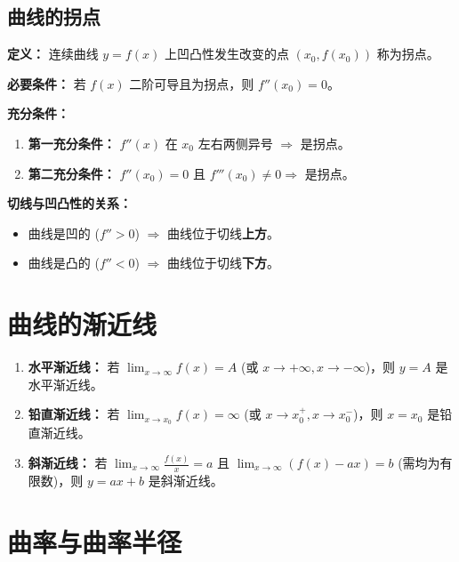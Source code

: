 \documentclass[a4paper,12pt]{ctexart}
\newenvironment{rednote}
  {\begin{tcolorbox}[colback=notepurple, colframe=highlightred, boxrule=1pt, title=\textbf{手写笔记/技巧补充}]}
  {\end{tcolorbox}}
\begin{document}
\subsection{曲线的拐点}
\textbf{定义：} 连续曲线 $y=f(x)$ 上凹凸性发生改变的点 $(x_0, f(x_0))$ 称为拐点。

\textbf{必要条件：} 若 $f(x)$ 二阶可导且为拐点，则 $f''(x_0) = 0$。

\textbf{充分条件：}
\begin{enumerate}
    \item \textbf{第一充分条件：} $f''(x)$ 在 $x_0$ 左右两侧异号 $\Rightarrow$ 是拐点。
    \item \textbf{第二充分条件：} $f''(x_0) = 0$ 且 $f'''(x_0) \neq 0 \Rightarrow$ 是拐点。
\end{enumerate}

\begin{rednote}
    \textbf{切线与凹凸性的关系：}
    \begin{itemize}
        \item 曲线是凹的 ($f'' > 0$) $\Rightarrow$ 曲线位于切线\textbf{上方}。
        \item 曲线是凸的 ($f'' < 0$) $\Rightarrow$ 曲线位于切线\textbf{下方}。
    \end{itemize}
\end{rednote}

\section{曲线的渐近线}

\begin{enumerate}
    \item \textbf{水平渐近线：}
    若 $\lim_{x \to \infty} f(x) = A$ (或 $x \to +\infty, x \to -\infty$)，则 $y = A$ 是水平渐近线。
    
    \item \textbf{铅直渐近线：}
    若 $\lim_{x \to x_0} f(x) = \infty$ (或 $x \to x_0^+, x \to x_0^-$)，则 $x = x_0$ 是铅直渐近线。
    
    \item \textbf{斜渐近线：}
    若 $\lim_{x \to \infty} \frac{f(x)}{x} = a$ 且 $\lim_{x \to \infty} (f(x) - ax) = b$ (需均为有限数)，则 $y = ax + b$ 是斜渐近线。
\end{enumerate}

\section{曲率与曲率半径}
\end{document}
